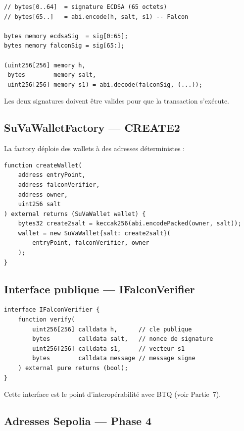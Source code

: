 \documentclass[11pt,a4paper]{article}
\begin{document}
\begin{lstlisting}[style=solidity, caption={Format de la signature UserOperation}]
// bytes[0..64]  = signature ECDSA (65 octets)
// bytes[65..]   = abi.encode(h, salt, s1) -- Falcon

bytes memory ecdsaSig  = sig[0:65];
bytes memory falconSig = sig[65:];

(uint256[256] memory h,
 bytes        memory salt,
 uint256[256] memory s1) = abi.decode(falconSig, (...));
\end{lstlisting}

Les deux signatures doivent être valides pour que la transaction s'exécute.

\subsection{SuVaWalletFactory --- CREATE2}

La factory déploie des wallets à des adresses déterministes :

\begin{lstlisting}[style=solidity]
function createWallet(
    address entryPoint,
    address falconVerifier,
    address owner,
    uint256 salt
) external returns (SuVaWallet wallet) {
    bytes32 create2salt = keccak256(abi.encodePacked(owner, salt));
    wallet = new SuVaWallet{salt: create2salt}(
        entryPoint, falconVerifier, owner
    );
}
\end{lstlisting}

\subsection{Interface publique --- IFalconVerifier}

\begin{lstlisting}[style=solidity, caption={Interface commune pour l'interopérabilité}]
interface IFalconVerifier {
    function verify(
        uint256[256] calldata h,      // cle publique
        bytes        calldata salt,   // nonce de signature
        uint256[256] calldata s1,     // vecteur s1
        bytes        calldata message // message signe
    ) external pure returns (bool);
}
\end{lstlisting}

Cette interface est le point d'interopérabilité avec BTQ (voir Partie~7).

\subsection{Adresses Sepolia --- Phase 4}
\end{document}
